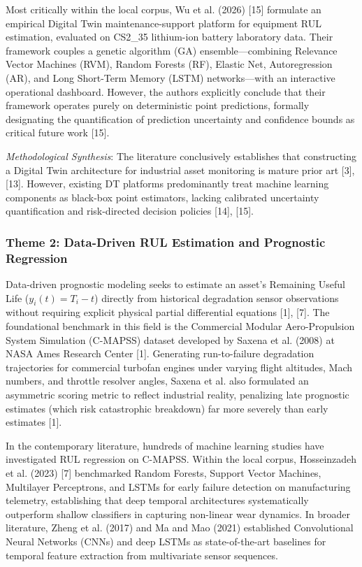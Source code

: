 \documentclass[12pt,a4paper]{article}
\begin{document}
Most critically within the local corpus, Wu et al. (2026) [15] formulate an empirical Digital Twin maintenance-support platform for equipment RUL estimation, evaluated on CS2\_35 lithium-ion battery laboratory data. Their framework couples a genetic algorithm (GA) ensemble—combining Relevance Vector Machines (RVM), Random Forests (RF), Elastic Net, Autoregression (AR), and Long Short-Term Memory (LSTM) networks—with an interactive operational dashboard. However, the authors explicitly conclude that their framework operates purely on deterministic point predictions, formally designating the quantification of prediction uncertainty and confidence bounds as critical future work [15].

\textit{Methodological Synthesis}: The literature conclusively establishes that constructing a Digital Twin architecture for industrial asset monitoring is mature prior art [3], [13]. However, existing DT platforms predominantly treat machine learning components as black-box point estimators, lacking calibrated uncertainty quantification and risk-directed decision policies [14], [15].

\subsubsection*{Theme 2: Data-Driven RUL Estimation and Prognostic Regression}
Data-driven prognostic modeling seeks to estimate an asset's Remaining Useful Life ($y_i(t) = T_i - t$) directly from historical degradation sensor observations without requiring explicit physical partial differential equations [1], [7]. The foundational benchmark in this field is the Commercial Modular Aero-Propulsion System Simulation (C-MAPSS) dataset developed by Saxena et al. (2008) at NASA Ames Research Center [1]. Generating run-to-failure degradation trajectories for commercial turbofan engines under varying flight altitudes, Mach numbers, and throttle resolver angles, Saxena et al. also formulated an asymmetric scoring metric to reflect industrial reality, penalizing late prognostic estimates (which risk catastrophic breakdown) far more severely than early estimates [1].

In the contemporary literature, hundreds of machine learning studies have investigated RUL regression on C-MAPSS. Within the local corpus, Hosseinzadeh et al. (2023) [7] benchmarked Random Forests, Support Vector Machines, Multilayer Perceptrons, and LSTMs for early failure detection on manufacturing telemetry, establishing that deep temporal architectures systematically outperform shallow classifiers in capturing non-linear wear dynamics. In broader literature, Zheng et al. (2017) and Ma and Mao (2021) established Convolutional Neural Networks (CNNs) and deep LSTMs as state-of-the-art baselines for temporal feature extraction from multivariate sensor sequences.
\end{document}
